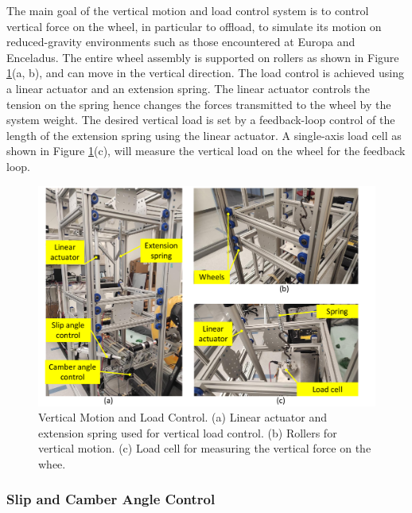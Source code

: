 \documentclass{article}
\begin{document}
The main goal of the vertical motion and load control system is to control vertical force on the wheel, in particular to offload, to simulate its motion on reduced-gravity environments such as those encountered at Europa and Enceladus. The entire wheel assembly is supported on rollers as shown in Figure \ref{fig:load-control}(a, b), and can move in the vertical direction. The load control is achieved using a linear actuator and an extension spring. The linear actuator controls the tension on the spring hence changes the forces transmitted to the wheel by the system weight. The desired vertical load is set by a feedback-loop control of the length of the extension spring using the linear actuator. A single-axis load cell as shown in Figure \ref{fig:load-control}(c), will measure the vertical load on the wheel for the feedback loop.

\begin{figure}[hbt!]
\centering
\includegraphics[width=6.50in]{test-rig-images/load-control.pdf}
\caption{Vertical Motion and Load Control. (a) Linear actuator and extension spring used for vertical load control. (b) Rollers for vertical motion. (c) Load cell for measuring the vertical force on the whee. }
\label{fig:load-control}
\end{figure}



\subsubsection{Slip and Camber Angle Control}
\label{subsubsec:slip-camber-control}
\end{document}
